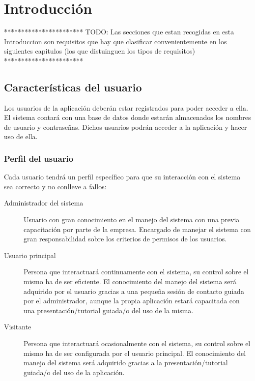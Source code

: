 \chapter{Introducci\'on}

	***********************\newline
	TODO: Las secciones que estan recogidas en esta Introduccion son requisitos que hay que clasificar convenientemente en los siguientes capitulos (los que distuinguen los tipos de requisitos)
	***********************\newline

\section{Caracter\'isticas del usuario}
	Los usuarios de la aplicaci\'on deber\'an estar registrados para poder acceder a ella. El sistema contar\'a con una base de datos donde estar\'an almacenados los nombres de usuario y contrase\~nas. Dichos usuarios podr\'an acceder a la aplicaci\'on y hacer uso de ella.
	
	\subsection{Perfil del usuario}
		Cada usuario tendr\'a un perfil espec\'ifico para que su interacci\'on con el sistema sea correcto y no conlleve a fallos:
		\begin{description}
			\item[Administrador del sistema] Usuario con gran conocimiento en el manejo del sistema con una previa capacitaci\'on por parte de la empresa. Encargado de manejar el sistema con gran responsabilidad sobre los criterios de permisos de los usuarios.
			
			\item[Usuario principal] Persona que interactuar\'a continuamente con el sistema, su control sobre el mismo ha de ser eficiente. El conocimiento del manejo del sistema ser\'a adquirido por el usuario gracias a una peque\~na sesi\'on de contacto guiada por el administrador, aunque la propia aplicaci\'on estar\'a capacitada con una presentaci\'on/tutorial guiada/o del uso de la misma.
			
			\item[Visitante] Persona que interactuar\'a ocasionalmente con el sistema, su control sobre el mismo ha de ser configurada por el usuario principal. El conocimiento del manejo del sistema será adquirido gracias a la presentaci\'on/tutorial guiada/o del uso de la aplicaci\'on.
		\end{description}

